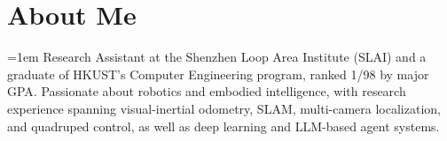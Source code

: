 \vspace{-\acvSectionTopSkip}

\section{About Me}
\vspace{\acvSectionContentTopSkip}

{\fontsize{9pt}{1.14em}\bodyfontlight\upshape\color{text}\justify
{}\emergencystretch=1em\relax
Research Assistant at the Shenzhen Loop Area Institute (SLAI) and a graduate of HKUST's Computer Engineering program, ranked 1/98 by major GPA. Passionate about robotics and embodied intelligence, with research experience spanning visual-inertial odometry, SLAM, multi-camera localization, and quadruped control, as well as deep learning and LLM-based agent systems.\par}
